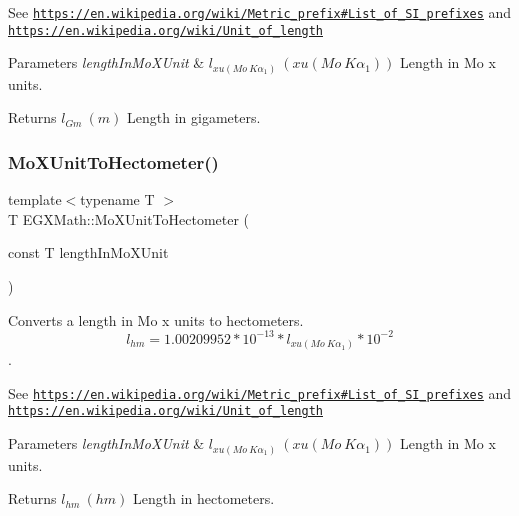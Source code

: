 See \href{https://en.wikipedia.org/wiki/Metric_prefix#List_of_SI_prefixes}{\tt https\+://en.\+wikipedia.\+org/wiki/\+Metric\+\_\+prefix\#\+List\+\_\+of\+\_\+\+S\+I\+\_\+prefixes} and \href{https://en.wikipedia.org/wiki/Unit_of_length}{\tt https\+://en.\+wikipedia.\+org/wiki/\+Unit\+\_\+of\+\_\+length} 
\begin{DoxyParams}{Parameters}
{\em length\+In\+Mo\+X\+Unit} & $ l_{xu(Mo\ K\alpha_1)}\ (xu(Mo\ K\alpha_1))$ Length in Mo x units. \\
\hline
\end{DoxyParams}
\begin{DoxyReturn}{Returns}
$ l_{Gm}\ (m)$ Length in gigameters. 
\end{DoxyReturn}
\mbox{\label{group___e_g_x_math-_conversions-_length_conversions-_non-_s_i-_mo_x_unit-_s_i_ga2114fcf66c72ded7cdfdb5fe0d574e92}} 
\subsubsection{\texorpdfstring{Mo\+X\+Unit\+To\+Hectometer()}{MoXUnitToHectometer()}}
{\footnotesize\ttfamily template$<$typename T $>$ \\
T E\+G\+X\+Math\+::\+Mo\+X\+Unit\+To\+Hectometer (\begin{DoxyParamCaption}\item[{const T}]{length\+In\+Mo\+X\+Unit }\end{DoxyParamCaption})}



Converts a length in Mo x units to hectometers. \[ l_{hm}=1.00209952*10^{-13} * l_{xu(Mo\ K\alpha_1)} * 10^{-2} \]. 

See \href{https://en.wikipedia.org/wiki/Metric_prefix#List_of_SI_prefixes}{\tt https\+://en.\+wikipedia.\+org/wiki/\+Metric\+\_\+prefix\#\+List\+\_\+of\+\_\+\+S\+I\+\_\+prefixes} and \href{https://en.wikipedia.org/wiki/Unit_of_length}{\tt https\+://en.\+wikipedia.\+org/wiki/\+Unit\+\_\+of\+\_\+length} 
\begin{DoxyParams}{Parameters}
{\em length\+In\+Mo\+X\+Unit} & $ l_{xu(Mo\ K\alpha_1)}\ (xu(Mo\ K\alpha_1))$ Length in Mo x units. \\
\hline
\end{DoxyParams}
\begin{DoxyReturn}{Returns}
$ l_{hm}\ (hm)$ Length in hectometers. 
\end{DoxyReturn}
\mbox{\label{group___e_g_x_math-_conversions-_length_conversions-_non-_s_i-_mo_x_unit-_s_i_ga1653c86da24ce9e73f72f67eb9595c2e}} 
